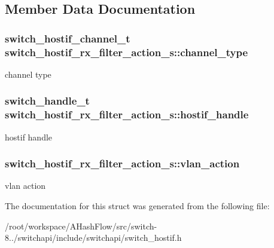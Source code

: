 \subsection{Member Data Documentation}
\hypertarget{structswitch__hostif__rx__filter__action__s_a0e411945f11d1b548a79be4045691213}{
\subsubsection[{channel\+\_\+type}]{\setlength{\rightskip}{0pt plus 5cm}switch\+\_\+hostif\+\_\+channel\+\_\+t switch\+\_\+hostif\+\_\+rx\+\_\+filter\+\_\+action\+\_\+s\+::channel\+\_\+type}}\label{structswitch__hostif__rx__filter__action__s_a0e411945f11d1b548a79be4045691213}
channel type \hypertarget{structswitch__hostif__rx__filter__action__s_a977f68ee2d87da51abba7deb5bfa9fc5}{
\subsubsection[{hostif\+\_\+handle}]{\setlength{\rightskip}{0pt plus 5cm}switch\+\_\+handle\+\_\+t switch\+\_\+hostif\+\_\+rx\+\_\+filter\+\_\+action\+\_\+s\+::hostif\+\_\+handle}}\label{structswitch__hostif__rx__filter__action__s_a977f68ee2d87da51abba7deb5bfa9fc5}
hostif handle \hypertarget{structswitch__hostif__rx__filter__action__s_a216bec8f68ff4b9a30ae0f29c86b53c5}{
\subsubsection[{vlan\+\_\+action}]{ switch\+\_\+hostif\+\_\+rx\+\_\+filter\+\_\+action\+\_\+s\+::vlan\+\_\+action}}\label{structswitch__hostif__rx__filter__action__s_a216bec8f68ff4b9a30ae0f29c86b53c5}
vlan action 

The documentation for this struct was generated from the following file\+:\begin{DoxyCompactItemize}
\item 
/root/workspace/\+A\+Hash\+Flow/src/switch-\/8../switchapi/include/switchapi/switch\+\_\+hostif.\+h\end{DoxyCompactItemize}
